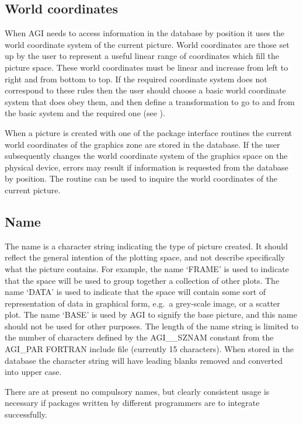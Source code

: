 \documentclass[twoside,11pt]{starlink}
\begin{document}
\subsection{World coordinates}
When AGI needs to access information in the database by position it uses the
world coordinate system of the current picture.
World coordinates are those set up by the user to represent a useful linear
range of coordinates which fill the picture space.
These world coordinates must be linear and increase from left to right
and from bottom to top. If the required coordinate system does not correspond
to these rules then the user should choose a basic world coordinate system
that does obey them, and then define a transformation to go to and from
the basic system and the required one (see
).

When a picture is created with one of the package interface routines the
current world coordinates of the graphics zone are stored in the database.
If the user subsequently changes the world coordinate system of the graphics
space on the physical device, errors may result if information is requested
from the database by position.
The routine 
can be used to inquire the world coordinates of the current picture.

\subsection{Name}
The name is a character string indicating the type of picture created.
It should reflect the general intention of the plotting space, and not
describe specifically what the picture contains.
For example, the name `FRAME' is used to indicate that the space will be used
to group together a collection of other plots.
The name `DATA' is used to indicate that the space will contain some sort of
representation of data in graphical form, e.g.\ a grey-scale image, or a
scatter plot.
The name `BASE' is used by AGI to signify the base picture, and this name
should not be used for other purposes.
The length of the name string is limited to the number of characters defined
by the AGI\_\_SZNAM constant from the AGI\_PAR FORTRAN include file
(currently 15 characters).
When stored in the database the character string will have leading blanks
removed and converted into upper case.

There are at present no compulsory names, but clearly consistent usage is
necessary if packages written by different programmers are to integrate
successfully.
\end{document}
